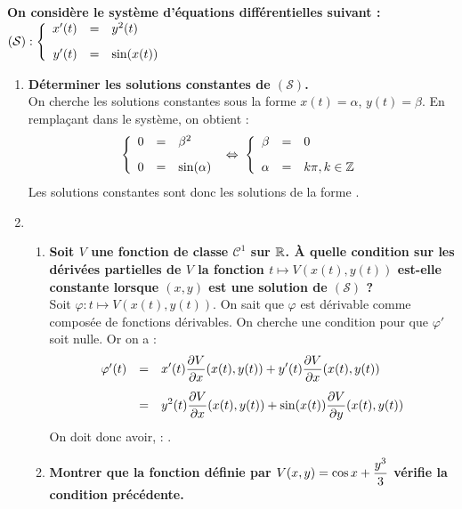 \documentclass[a4paper, 11pt,reqno]{article}
\begin{document}
\begin{correction}  \;
\textbf{On consid\`ere le syst\`eme d'\'equations diff\'erentielles suivant : $(\mathcal{S}) : \left\{ \begin{array}{rcl}
x'(t) & = & y^2(t)\vsec\\
y'(t) & = & \sin (x(t))
\end{array} \right.$}
\begin{enumerate}
\item \textbf{D\'eterminer les solutions constantes de $(\mathcal{S})$.}\\
On cherche les solutions constantes sous la forme  $x(t) = \alpha$, $y(t) = \beta$. En rempla\c cant dans le syst\`eme, on obtient :
$$ \left\{ \begin{array}{rcl}
0 & = & \beta^2\vsec\\
0 & = & \sin (\alpha)
\end{array} \right.
\; \Leftrightarrow \;
\left\{ \begin{array}{rcl}
\beta & = & 0\vsec\\
\alpha & = & k \pi, k \in \Z
\end{array} \right.$$
Les solutions constantes sont donc les solutions de la forme .
\item 
\begin{enumerate}
\item \textbf{Soit $V$ une fonction de classe $\mathcal{C}^1$ sur $\mathbb{R}$. \`A quelle condition sur les d\'eriv\'ees partielles de $V$ la fonction $t\mapsto V(x(t),y(t))$ est-elle constante lorsque $(x,y)$ est une solution de  $(\mathcal{S})$ ?}\\
Soit $\varphi : t\mapsto V(x(t),y(t))$. On sait que $\varphi$ est d\'erivable comme compos\'ee de fonctions d\'erivables. On cherche une condition pour que $\varphi'$ soit nulle. Or on a :
$$\begin{array}{rcl}
\varphi'(t) & = &\ddp x'(t) \frac{\partial V}{\partial x} (x(t),y(t)) + y'(t) \frac{\partial V}{\partial x} (x(t),y(t)) \vsec\\
& = & \ddp y^2(t) \frac{\partial V}{\partial x} (x(t),y(t)) + \sin(x(t)) \frac{\partial V}{\partial y} (x(t),y(t))
\end{array}$$
On doit donc avoir, : .
\item \textbf{Montrer que la fonction d\'efinie par $\displaystyle V(x,y) = \cos x + \frac{y^3}{3}$ v\'erifie la condition pr\'ec\'edente.}\\

\end{enumerate}
\end{enumerate}
\end{correction}
\end{document}
